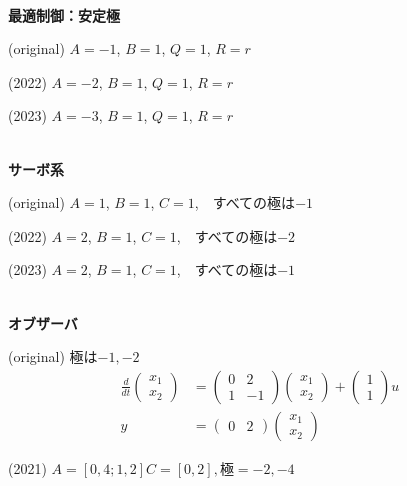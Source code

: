 \ \\ \noindent
{\bf 最適制御：安定極}

(original)
$A=-1$, $B=1$, $Q=1$, $R=r$

(2022)
{\color{red}$A=-2$}, $B=1$, $Q=1$, $R=r$

(2023)
{\color{red}$A=-3$}, $B=1$, $Q=1$, $R=r$

\ \\ \noindent
{\bf サーボ系}

(original)
$A=1$, $B=1$, $C=1$,　すべての極は$-1$

(2022)
{\color{red}$A=2$}, $B=1$, $C=1$,　すべての極は{\color{red}$-2$}

(2023)
{\color{red}$A=2$}, $B=1$, $C=1$,　すべての極は{\color{red}$-1$}

\ \\ \noindent
{\bf オブザーバ}

(original) 極は$-1, -2$
\begin{align*}
	\frac{d}{dt}
	\left (
	\begin{array}{c}
	 x_1 \\ x_2 
	\end{array}
	\right )
	& = 
	\left (
	\begin{array}{cc}
	 0 & 2 \\
	 1 & -1
	\end{array}
	\right )
	\left (
	\begin{array}{c}
	 x_1 \\ x_2 
	\end{array}
	\right )
	+
	\left (
	\begin{array}{c}
	 1 \\ 1 
	\end{array}
	\right )
	u
\\
	y&=
	\left ( \begin{array}{cc}
		0 & 2 
	\end{array} \right )
	\left (	\begin{array}{c}
		x_1 \\ x_2 
	\end{array} \right )
\end{align*}

(2021) $A=[0,4;1,2] C=[0,2], 極=-2,-4$

